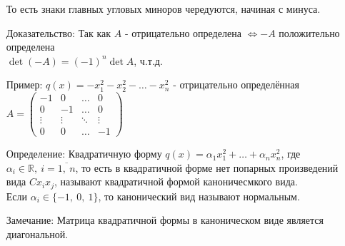 \documentclass[12pt, letterpaper, twoside]{article}
\begin{document}
\begin{enumerate}
        То есть знаки главных угловых миноров чередуются, начиная с минуса.
        \item[Доказательство:] Так как $A$ - отрицательно определена $\Leftrightarrow -A$ положительно определена\\
        $\det (-A)=  (-1)^n\det A$, ч.т.д.
        \item[Пример:] $q(x) = -x_1^2 - x_2^2 - \dots - x_n^2$ - отрицательно определённая\\
        $A = \begin{pmatrix}
            -1 & 0 & \dots & 0\\
            0 & -1 & \dots & 0\\
            \vdots & \vdots & \ddots & \vdots\\
            0 & 0 & \dots & -1
        \end{pmatrix}$
        \item[Определение:] Квадратичную форму $q(x) = \alpha_1 x_1^2 + \dots + \alpha_n x_n^2$, где $\alpha_i\in\mathbb{R},\ i = \overline{1,\ n}$, то есть в квадратичной форме нет попарных произведений вида $Cx_ix_j$, называют квадратичной формой каноничесмкого вида.\\
        Если $\alpha_i\in \{-1,\ 0,\ 1\}$, то канонический вид называют нормальным.
        \item[Замечание:] Матрица квадратичной формы в каноническом виде является диагональной.
    \end{enumerate}
\end{document}

